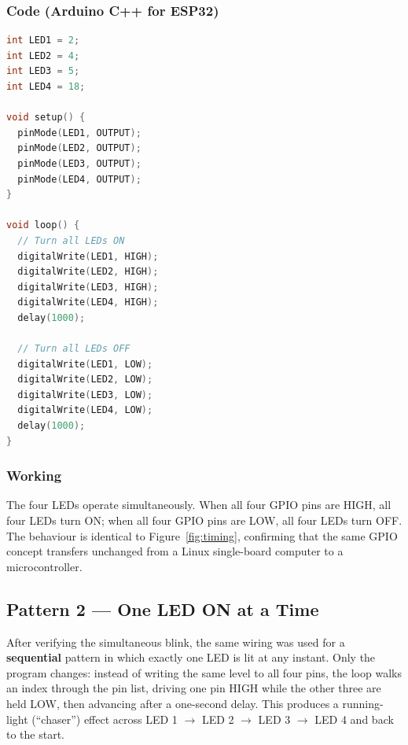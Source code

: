 \documentclass[10pt,a4paper]{article}
\begin{document}
\subsubsection{Code (Arduino C++ for ESP32)}

\begin{lstlisting}[language=C++, caption={Blinking four LEDs simultaneously on the ESP32.}, label={lst:esp}]
int LED1 = 2;
int LED2 = 4;
int LED3 = 5;
int LED4 = 18;

void setup() {
  pinMode(LED1, OUTPUT);
  pinMode(LED2, OUTPUT);
  pinMode(LED3, OUTPUT);
  pinMode(LED4, OUTPUT);
}

void loop() {
  // Turn all LEDs ON
  digitalWrite(LED1, HIGH);
  digitalWrite(LED2, HIGH);
  digitalWrite(LED3, HIGH);
  digitalWrite(LED4, HIGH);
  delay(1000);

  // Turn all LEDs OFF
  digitalWrite(LED1, LOW);
  digitalWrite(LED2, LOW);
  digitalWrite(LED3, LOW);
  digitalWrite(LED4, LOW);
  delay(1000);
}
\end{lstlisting}

\subsubsection{Working}

The four LEDs operate simultaneously. When all four GPIO pins are HIGH, all four
LEDs turn ON; when all four GPIO pins are LOW, all four LEDs turn OFF. The behaviour
is identical to Figure~\ref{fig:timing}, confirming that the same GPIO concept
transfers unchanged from a Linux single-board computer to a microcontroller.

\subsection{Pattern 2 --- One LED ON at a Time}

After verifying the simultaneous blink, the same wiring was used for a
\textbf{sequential} pattern in which exactly one LED is lit at any instant. Only the
program changes: instead of writing the same level to all four pins, the loop walks
an index through the pin list, driving one pin HIGH while the other three are held
LOW, then advancing after a one-second delay. This produces a running-light
(``chaser'') effect across LED 1 $\to$ LED 2 $\to$ LED 3 $\to$ LED 4 and back to the
start.
\end{document}
